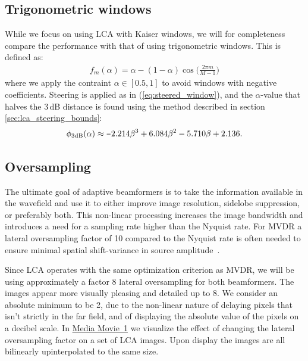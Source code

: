 \documentclass[10pt,journal,draftclsnofoot,onecolumn]{IEEEtran}
\newcounter{todoidx}
\newlength\marginparwidthsmall
\newcommand\todo[1]{%
      \addtocounter{todoidx}{1}%
      {\color{Red}\bf(\thetodoidx{})}%
      \marginpar{%
         {\vspace*{-10pt}\color{Red}\fbox{\bf\thetodoidx{}}}\\%
         \fcolorbox{red}{todobackground}{\parbox{\marginparwidthsmall}{\raggedright\scriptsize #1}}}}
\newcommand\todo[1]{}
\newcommand\1{\vec 1}
\newcommand\minus{\scalebox{0.75}[1.0]{$-$}}
\newcommand\multimedia[2]{\href{#1}{#2}}
\newcommand\mediaPath{http://folk.uio.no/joibu/media/2015_JOE_LCA}
\newcommand\mediaI{\multimedia{\mediaPath/media1.mp4}{Media Movie~1}}
\begin{document}
\subsection{Trigonometric windows}\label{sec:lca_trigonometric}

While we focus on using LCA with Kaiser windows, we will for completeness compare the performance with that of using trigonometric windows. This is defined as:
%
\begin{align}
f_m(\alpha) = \alpha - (1-\alpha)\cos\Big(\frac{2\pi m}{M-1}\Big)\label{eq:trig_window_function}
\end{align}
%
where we apply the contraint $\alpha\in[0.5,1]$ to avoid windows with negative coefficients. Steering is applied as in (\ref{eq:steered_window}), and the $\alpha$-value that halves the 3\,dB distance is found using the method described in section \ref{sec:lca_steering_bounds}:
%
\begin{align}
\phi_\text{3dB}(\alpha) \approx \minus{}2.214\beta^3 + 6.084\beta^2 - 5.710\beta + 2.136.
\end{align}


\subsection{Oversampling}\label{sec:lca_oversampling}

The ultimate goal of adaptive beamformers is to take the information available in the wavefield and use it to either improve image resolution, sidelobe suppression, or preferably both. This non-linear processing increases the image bandwidth and introduces a need for a sampling rate higher than the Nyquist rate. For MVDR a lateral oversampling factor of 10 compared to the Nyquist rate is often needed to ensure minimal spatial shift-variance in source amplitude~\cite{Asen2014}.

Since LCA operates with the same optimization criterion as MVDR, we will be using approximately a factor 8 lateral oversampling for both beamformers. The images appear more visually pleasing and detailed up to 8. We consider an absolute minimum to be 2, due to the non-linear nature of delaying pixels that isn't strictly in the far field, and of displaying the absolute value of the pixels on a decibel scale. In \mediaI{} we visualize the effect of changing the lateral oversampling factor on a set of LCA images. Upon display the images are all bilinearly upinterpolated to the same size. 
% 
\end{document}
